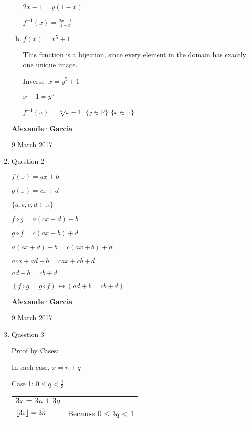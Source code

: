 \documentclass[11pt]{article}
\DeclarePairedDelimiter\floor{\lfloor}{\rfloor}
\begin{document}
\begin{enumerate}
\begin{enumerate}[(a)]
				$2x - 1 = y(1 - x)$

				$f^{-1}(x) = \frac{2x-1}{1-x}$ \\

			\item $f(x) = x^5 + 1$

				This function is a bijection, since every element in the domain has exactly one unique
				image.

				Inverse: $x = y^5 + 1$

				$x-1 = y^5$

				$f^{-1}(x) = \sqrt[5]{x-1}$
				$\{y \in \mathbb{R}\}$
				$\{x \in \mathbb{R}\}$


		\end{enumerate}

	\newpage

	\textbf{Alexander Garcia}

	9 March 2017 \\

	\item Question 2

		$f(x) = ax + b$

		$g(x) = cx + d$

		$\{a, b, c, d \in \mathbb{R}\}$

		$f \circ g = a(cx + d) + b$

		$g \circ f = c(ax + b) + d$

		$a(cx + d) + b = c(ax + b) + d$

		$acx + ad + b = cax + cb + d$

		$ad + b = cb + d$

		$(f \circ g = g \circ f) \leftrightarrow
		(ad + b = cb + d)$ \\


		\newpage

		\textbf{Alexander Garcia}

		9 March 2017 \\

	\item Question 3

		Proof by Cases:

		In each case, $x = n + q$

		Case 1: $0 \leq q < \frac{1}{3}$

		\begin{tabular}{ll}
			$3x = 3n + 3q$ \\

			$\floor*{3x} = 3n$ &
			Because $0 \leq 3q < 1$ \\


\end{tabular}
\end{enumerate}
\end{document}
